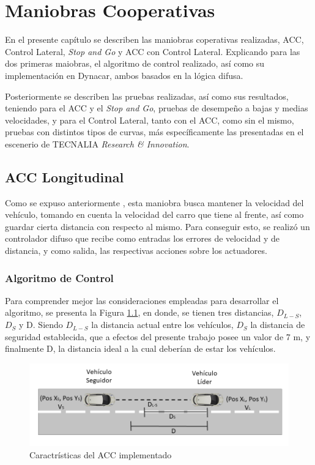 \chapter{Maniobras Cooperativas}\label{sec:capitulo6}
\thispagestyle{empty}

En el presente capítulo se describen las maniobras coperativas realizadas, ACC, Control Lateral, \textit{Stop and Go} y ACC con Control Lateral. Explicando para las dos primeras maiobras, el algoritmo de control realizado, así como su implementación en Dynacar, ambos basados en la lógica difusa.\\

\par Posteriormente se describen las pruebas realizadas, así como sus resultados, teniendo para el ACC y el \textit{Stop and Go}, pruebas de desempeño a bajas y medias velocidades, y para el Control Lateral, tanto con el ACC, como sin el mismo, pruebas con distintos tipos de curvas, más específicamente las presentadas en el escenerio de TECNALIA \textit{Research \& Innovation}.  


\section{ACC Longitudinal}
Como se expuso anteriormente , esta maniobra busca mantener la velocidad del vehículo, tomando en cuenta la velocidad del carro que tiene al frente, así como guardar cierta distancia con respecto al mismo. Para conseguir esto, se realizó un controlador difuso\cite{perez2013cooperative} que recibe como entradas los errores de velocidad y de distancia, y como salida, las respectivas acciones sobre los actuadores.  

\subsection{Algoritmo de Control}

Para comprender mejor las consideraciones empleadas para desarrollar el algoritmo, se presenta la Figura \ref{fig:acce}, en donde, se tienen tres distancias, $ D_{L-S}$, $ D_{S}$ y D. Siendo $D_{L-S}$ la distancia actual entre los vehículos, $D_{S}$ la distancia de seguridad establecida, que a efectos del presente trabajo posee un valor de 7 m, y finalmente D, la distancia ideal a la cual deberían de estar los vehículos.\\

\begin{figure}[!h]
	\centering
		\includegraphics[scale=0.5]{Imagenes/acce}
		\caption{Caractrísticas del ACC implementado}
		\label{fig:acce}
	\end{figure}	 

